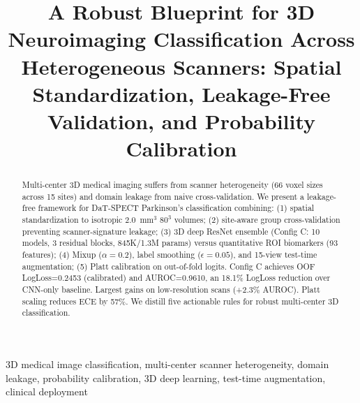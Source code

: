 \documentclass[conference]{IEEEtran}
\begin{document}
\title{A Robust Blueprint for 3D Neuroimaging Classification Across Heterogeneous Scanners: Spatial Standardization, Leakage-Free Validation, and Probability Calibration}

\author{
}

\maketitle

\begin{abstract}
Multi-center 3D medical imaging suffers from scanner heterogeneity (66 voxel sizes across 15 sites) and domain leakage from naive cross-validation. We present a leakage-free framework for DaT-SPECT Parkinson's classification combining: (1) spatial standardization to isotropic 2.0~mm$^3$ $80^3$ volumes; (2) site-aware group cross-validation preventing scanner-signature leakage; (3) 3D deep ResNet ensemble (Config C: 10 models, 3 residual blocks, 845K/1.3M params) versus quantitative ROI biomarkers (93 features); (4) Mixup ($\alpha=0.2$), label smoothing ($\epsilon=0.05$), and 15-view test-time augmentation; (5) Platt calibration on out-of-fold logits. Config C achieves OOF LogLoss=0.2453 (calibrated) and AUROC=0.9610, an 18.1\% LogLoss reduction over CNN-only baseline. Largest gains on low-resolution scans (+2.3\% AUROC). Platt scaling reduces ECE by 57\%. We distill five actionable rules for robust multi-center 3D classification.
\end{abstract}

\begin{IEEEkeywords}
3D medical image classification, multi-center scanner heterogeneity, domain leakage, probability calibration, 3D deep learning, test-time augmentation, clinical deployment
\end{IEEEkeywords}










\end{document}
